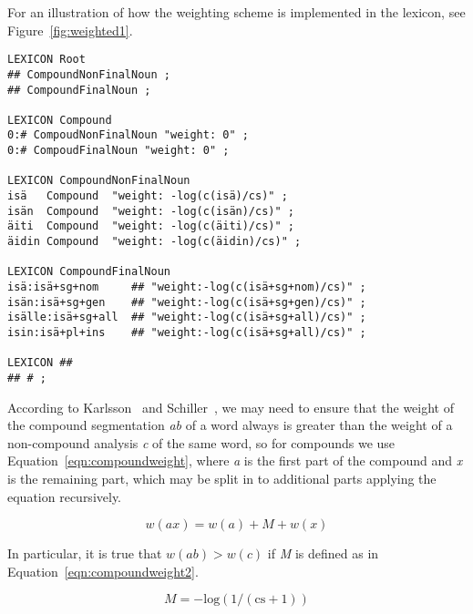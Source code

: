 \documentclass[11pt]{article}
\begin{document}
For an illustration of how the weighting scheme is implemented in the
lexicon, see Figure~\ref{fig:weighted1}.

\begin{figure*}[htb!]
\begin{small}
\begin{verbatim}
LEXICON Root
## CompoundNonFinalNoun ;
## CompoundFinalNoun ;

LEXICON Compound
0:# CompoudNonFinalNoun "weight: 0" ;
0:# CompoudFinalNoun "weight: 0" ;

LEXICON CompoundNonFinalNoun
isä   Compound  "weight: -log(c(isä)/cs)" ;
isän  Compound  "weight: -log(c(isän)/cs)" ;
äiti  Compound  "weight: -log(c(äiti)/cs)" ;
äidin Compound  "weight: -log(c(äidin)/cs)" ;

LEXICON CompoundFinalNoun
isä:isä+sg+nom     ## "weight:-log(c(isä+sg+nom)/cs)" ;
isän:isä+sg+gen    ## "weight:-log(c(isä+sg+gen)/cs)" ;
isälle:isä+sg+all  ## "weight:-log(c(isä+sg+all)/cs)" ;
isin:isä+pl+ins    ## "weight:-log(c(isä+sg+all)/cs)" ;

LEXICON ##
## # ;
\end{verbatim}
\caption{Structure weighting scheme using token penalties.
}\label{fig:weighted1}
\end{small}
\end{figure*}

According to Karlsson~\cite{karlsson/1992} and
Schiller~\cite{schiller/2005}, we may need to ensure that the
weight of the compound segmentation \emph{ab} of a word always is
greater than the weight of a non-compound analysis \emph{c} of the
same word, so for compounds we use Equation~\ref{eqn:compoundweight},
where \emph{a} is the first part of the compound and \emph{x} is the
remaining part, which may be split in to additional parts applying the
equation recursively.

\begin{small}
  \begin{equation}
    \label{eqn:compoundweight}
    w(ax) = w(a) + M + w(x)
  \end{equation}
\end{small}

In particular, it is true that $w(ab) > w(c)$ if \emph{M} is
defined as in Equation~\ref{eqn:compoundweight2}.

\begin{small}
  \begin{equation}
    \label{eqn:compoundweight2}
    M = -\mathrm{log}(1/(\mathrm{cs}+1))
  \end{equation}
\end{small}
\end{document}

